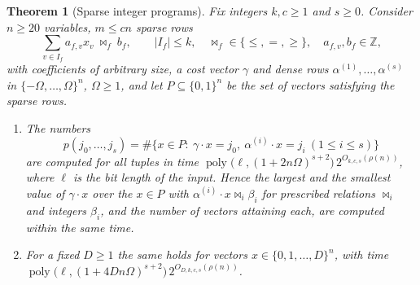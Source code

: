 \documentclass[11pt,reqno]{amsart}
\numberwithin{equation}{section}
\theoremstyle{plain}
\newtheorem{theorem}{Theorem}[section]
\theoremstyle{definition}
\theoremstyle{remark}
\DeclareMathOperator{\poly}{poly}
\newcommand{\Z}{\mathbb{Z}}
\newcommand{\rhon}{\rho}
\begin{document}
\begin{theorem}[Sparse integer programs]\label{thm:ip}
Fix integers $k,c\ge1$ and $s\ge0$. Consider $n\ge20$ variables, $m\le cn$
sparse rows
\[
  \sum_{v\in I_f}a_{f,v}x_v\ \bowtie_f\ b_f,\qquad |I_f|\le k,\quad
  {\bowtie_f}\in\{\le,=,\ge\},\quad a_{f,v},b_f\in\Z,
\]
with coefficients of arbitrary size, a cost vector $\gamma$ and dense rows
$\alpha^{(1)},\dots,\alpha^{(s)}$ in $\{-\Omega,\dots,\Omega\}^n$, $\Omega\ge1$,
and let $P\subseteq\{0,1\}^n$ be the set of vectors satisfying the sparse rows.
\begin{enumerate}[label=\textup{(\roman*)},leftmargin=2.2em]
\item\label{it:ip01} The numbers
\[
  p(j_0,\dots,j_s)=\#\bigl\{x\in P:\ \gamma\cdot x=j_0,\ \alpha^{(i)}\cdot x=j_i\ (1\le i\le s)\bigr\}
\]
are computed for all tuples in time
$\poly\bigl(\ell,(1+2n\Omega)^{s+2}\bigr)\,2^{O_{k,c,s}(\rhon(n))}$, where $\ell$
is the bit length of the input. Hence the largest and the smallest value of
$\gamma\cdot x$ over the $x\in P$ with $\alpha^{(i)}\cdot x\bowtie_i\beta_i$ for
prescribed relations $\bowtie_i$ and integers $\beta_i$, and the number of
vectors attaining each, are computed within the same time.
\item\label{it:ipD} For a fixed $D\ge1$ the same holds for vectors
$x\in\{0,1,\dots,D\}^n$, with time
$\poly\bigl(\ell,(1+4Dn\Omega)^{s+2}\bigr)\,2^{O_{D,k,c,s}(\rhon(n))}$.
\end{enumerate}
\end{theorem}
\end{document}
